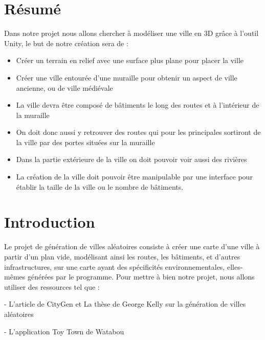 \section{Résumé}

Dans notre projet nous allons chercher à modéliser une ville en 3D grâce à l'outil Unity, le but de notre création sera de :
\begin{itemize}
	\item Créer un terrain en relief avec une surface plus plane pour placer la ville
	\item Créer une ville entourée d'une muraille pour obtenir un aspect de ville ancienne, ou de ville médiévale
	\item La ville devra être composé de bâtiments le long des routes et à l'intérieur de la muraille
	\item On doit donc aussi y retrouver des routes qui pour les principales sortiront de la ville par des portes situées sur la muraille
	\item Dans la partie extérieure de la ville on doit pouvoir voir aussi des rivières
	\item La création de la ville doit pouvoir être manipulable par une interface pour établir la taille de la ville ou le nombre de bâtiments.
\end{itemize}

\section{Introduction}

Le projet de génération de villes aléatoires consiste à créer une carte d’une ville à partir d'un plan vide, modélisant ainsi les routes, les bâtiments, et d’autres infrastructures, sur une carte
ayant des spécificités environnementales, elles-mêmes générées par le programme.
Pour mettre à bien notre projet, nous allons utiliser des ressources tel que :

\tab - L’article de CityGen et La thèse de George Kelly sur la génération de villes aléatoires

\tab - L’application Toy Town de Watabou
